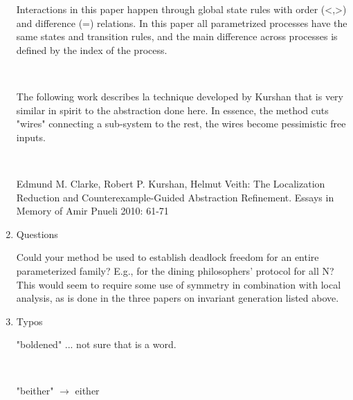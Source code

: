 \begin{enumerate}
{  Interactions in this paper happen through global state rules with order 
  (<,>) and difference (\not=) relations. 
  In this paper all parametrized processes have the same states and transition rules, and the main difference across processes is defined by the index
  of the process. 
}

~

The following work describes la technique developed by Kurshan that is very similar in spirit to the abstraction done here. In essence, the method cuts "wires" connecting a sub-system to the rest, the wires become pessimistic free inputs.

~

Edmund M. Clarke, Robert P. Kurshan, Helmut Veith:
The Localization Reduction and Counterexample-Guided Abstraction Refinement. Essays in Memory of Amir Pnueli 2010: 61-71


\item Questions


Could your method be used to establish deadlock freedom for an entire parameterized family? E.g., for the dining philosophers' protocol for all N? This would seem to require some use of symmetry in combination with local analysis, as is done in the three papers on invariant generation listed above.


\item Typos


"boldened" ... not sure that is a word.

~

"beither" $\rightarrow$ either
\end{enumerate}
